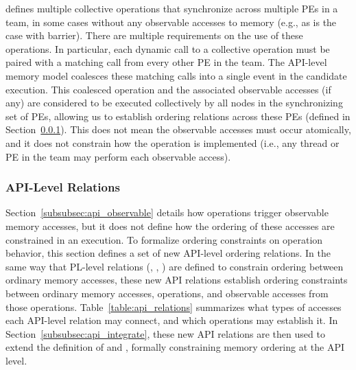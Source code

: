 \openshmem defines multiple collective operations that synchronize across multiple
    \acp{PE} in a team, in some cases without any observable accesses to memory (e.g.,
    as is the case with barrier).
There are multiple requirements on the use of these operations. In particular, each
    dynamic call to a collective operation must be paired with a matching call from
    every other \ac{PE} in the team.
The API-level memory model coalesces these matching calls into a single event in the
    candidate execution.
This coalesced operation and the associated observable accesses (if any) are considered
    to be executed collectively by all nodes in the synchronizing set of \acp{PE},
    allowing us to establish ordering relations across these \acp{PE} (defined in
    Section~\ref{subsubsec:api_relations}).
This does not mean the observable accesses must occur atomically, and it does not
    constrain how the operation is implemented (i.e., any thread or \ac{PE} in the team
    may perform each observable access).

\subsubsection{API-Level Relations}\label{subsubsec:api_relations}

Section~\ref{subsubsec:api_observable} details how operations trigger observable memory
    accesses, but it does not define how the ordering of these accesses are constrained
    in an execution. To formalize ordering constraints on \openshmem operation behavior,
    this section defines a set of new API-level ordering relations.
In the same way that PL-level relations (\relSB{}, \relSW{}, \relHB{}) are defined to
    constrain ordering between ordinary memory accesses, these new API relations
    establish ordering constraints between ordinary memory accesses, operations, and
    observable accesses from those operations.
Table~\ref{table:api_relations} summarizes what types of accesses each API-level
    relation may connect, and which \openshmem operations may establish it.
In Section~\ref{subsubsec:api_integrate}, these new API relations are then used to
    extend the definition of \relHB{} and \relDR{}, formally constraining memory
    ordering at the API level.

